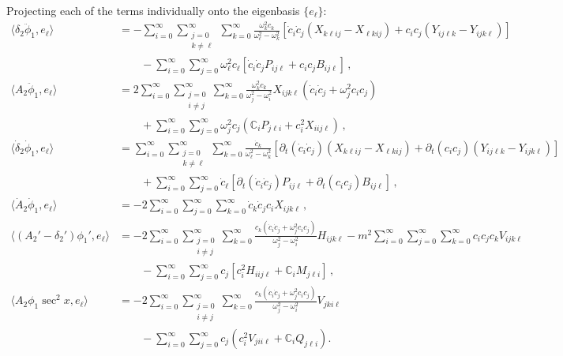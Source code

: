 \documentclass[letterpaper,11pt]{article}
\newcommand{\p}{\partial}
\newcommand{\oi}{\omega_i}
\newcommand{\oj}{\omega_j}
\newcommand{\ok}{\omega_k}
\newcommand{\ol}{\omega_\ell}
\begin{document}
Projecting each of the terms individually onto the eigenbasis $\{ e_\ell \}$:
\begin{align}
\langle \delta_2 \ddot \phi_1, e_\ell \rangle &= - \sum_{i = 0}^\infty \sum_{\substack{j=0 \\ k \neq \ell}}^\infty \sum_{k=0}^\infty \frac{\ok^2 c_k}{\ol^2 - \ok^2} \left[\dot c_i \dot c_j \left(X_{k\ell ij} - X_{\ell k i j} \right) + c_i c_j \left( Y_{ij\ell k} - Y_{ijk\ell} \right) \right] \nonumber \\
& \qquad  - \sum_{i=0}^\infty \sum_{j=0}^\infty \ol^2 c_\ell \left[ \dot c_i \dot c_j P_{ij\ell} + c_i c_j B_{i j \ell} \right] \, , \\
%
\langle A_2 \ddot \phi_1, e_\ell \rangle &= 2 \sum_{i = 0}^\infty \sum_{\substack{j=0 \\ i \neq j}}^\infty \sum_{k=0}^\infty \frac{\ok^2 c_k}{\oj^2 - \oi^2} X_{ijk \ell} \left( \dot c_i \dot c_j + \oj^2 c_i c_j \right) \nonumber \\
& \qquad + \sum_{i = 0}^\infty \sum_{j = 0}^\infty \oj^2 c_j \left( \mathbb C_i P_{j \ell i} + c_i^2 X_{ii j \ell} \right) \, , \\
%
\langle \dot \delta_2 \dot \phi_1 , e_\ell \rangle &= \sum_{i = 0}^\infty \sum_{\substack{j=0 \\ k \neq \ell}}^\infty \sum_{k=0}^\infty \frac{\dot c_k}{\ol^2 - \ok^2} \left[ \p_t \left( \dot c_i \dot c_j \right) \left( X_{k\ell ij} - X_{\ell k i j} \right) + \p_t (c_i c_j) \left(Y_{ij\ell k} - Y_{ijk\ell}\right) \right] \nonumber \\
& \qquad+ \sum_{i=0}^\infty \sum_{j=0}^\infty \dot c_\ell \left[ \p_t \left( \dot c_i \dot c_j \right) P_{ij\ell} + \p_t (c_i c_j) B_{ij\ell} \right] \, , \\
%
\langle \dot A_2 \dot \phi_1, e_\ell \rangle &= -2 \sum_{i=0}^\infty \sum_{j=0}^\infty \sum_{k=0}^\infty  \dot c_k \dot c_j c_i X_{ijk\ell} \, , \\
%
\langle \left( A_2' - \delta_2' \right) \phi_1', e_\ell \rangle &= - 2 \sum_{i = 0}^\infty \sum_{\substack{j=0 \\ i \neq j}}^\infty \sum_{k=0}^\infty \frac{c_k (\dot c_i \dot c_j + \oj^2 c_i c_j)}{\oj^2 -\oi^2} H_{ijk\ell} -m^2 \sum_{i=0}^\infty \sum _{j=0}^\infty \sum_{k=0}^\infty c_i c_j c_k V_{ijk\ell} \nonumber \\
%
& \qquad - \sum_{i=0}^\infty \sum_{j=0}^\infty c_j \left[ c_i^2 H_{iij\ell} + \mathbb C_i M_{j \ell i} \right] \, , \\
%
\langle A_2 \phi_1 \sec^2 x, e_\ell \rangle &= - 2\sum_{i = 0}^\infty \sum_{\substack{j=0 \\ i \neq j}}^\infty \sum_{k=0}^\infty \frac{c_k (\dot c_i \dot c_j + \oj^2 c_i c_j )}{\oj^2 - \oi^2} V_{jki\ell} \nonumber \\
& \qquad - \sum_{i=0}^\infty \sum_{j=0}^\infty c_j \left( c_i^2 V_{jii\ell} + \mathbb C_i Q_{j\ell i} \right) .
\end{align}
\end{document}
